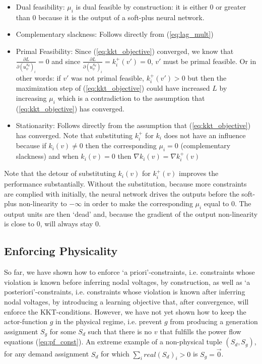 \begin{itemize}
\item Dual feasibility: $\mu_i$ is dual feasible by construction: it is either $0$ or greater than $0$ because it is the output of a soft-plus neural network.
\item Complementary slackness: Follows directly from (\ref{eq:lag_mult})
\item Primal Feasibility: Since (\ref{eq:kkt_objective}) converged, we know that $\frac{\partial L}{\partial (\mathfrak{u}_\psi^{S_d})_i} = 0$ and since $\frac{\partial L}{\partial (\mathfrak{u}_\psi^{S_d})_i} = k^+_i(v') = 0$, $v'$ must be primal feasible. Or in other words: if $v'$ was not primal feasible, $k^+_i(v') > 0$ but then the maximization step of (\ref{eq:kkt_objective}) could have increased $L$ by increasing $\mu_i$ which is a contradiction to the assumption that (\ref{eq:kkt_objective}) has converged.
\item Stationarity: Follows directly from the assumption that (\ref{eq:kkt_objective}) has converged. Note that substituting $k^+_i$ for $k_i$ does not have an influence because if $k_i(v) \neq 0$ then the corresponding $\mu_i = 0$ (complementary slackness) and when $k_i(v) = 0$ then $\nabla k_i(v) = \nabla k_i^+(v)$
\end{itemize}

Note that the detour of substituting $k_i(v)$ for $k_i^+(v)$ improves the performance substantially. Without the substitution, because more constraints are complied with initially, the neural network drives the outputs before the soft-plus non-linearity to $-\infty$ in order to make the corresponding $\mu_i$ equal to 0. The output units are then `dead' and, because the gradient of the output non-linearity is close to 0, will always stay 0.

\subsection{Enforcing Physicality}
\label{sec:enforcing_phys}
So far, we have shown how to enforce `a priori'-constraints, i.e. constraints whose violation is known before inferring nodal voltages, by construction, as well as `a posteriori'-constraints, i.e. constraints whose violation is known after inferring nodal voltages, by introducing a learning objective that, after convergence, will enforce the KKT-conditions. However, we have not yet shown how to keep the actor-function $g$ in the physical regime, i.e. prevent $g$ from producing a generation assignment $S_g$ for some $S_d$ such that there is no $v$ that fulfills the power flow equations (\ref{eq:pf_const}). An extreme example of a non-physical tuple $(S_d, S_g)$, for any demand assignment $S_d$ for which $\sum_i real(S_d)_i > 0$ is $S_g = \vec{0}$. 

